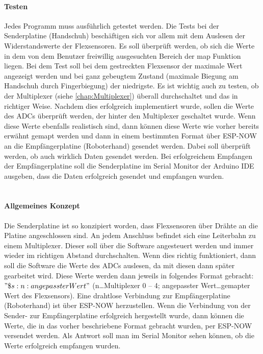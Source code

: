 \documentclass[titlepage,12pt,twoside]{article}
\begin{document}
\paragraph{Testen}
\hfill \break
\hfill \break
Jedes Programm muss ausführlich getestet werden. Die Tests bei der Senderplatine (Handschuh) beschäftigen sich vor allem mit 
dem Auslesen der Widerstandswerte der Flexsensoren. Es soll überprüft werden, ob sich die Werte in dem von dem Benutzer 
freiwillig ausgesuchten Bereich der map Funktion liegen. Bei dem Test soll bei dem gestreckten Flexsensor der maximale Wert 
angezeigt werden und bei ganz gebeugtem Zustand (maximale Biegung am Handschuh durch Fingerbiegung) der niedrigste. Es ist 
wichtig auch zu testen, ob der Multiplexer (siehe \autoref{chap:Multiplexer}) überall durchschaltet und das in richtiger Weise. Nachdem dies erfolgreich 
implementiert wurde, sollen die Werte des ADCs überprüft werden, der hinter den Multiplexer geschaltet wurde. Wenn diese Werte 
ebenfalls realistisch sind, dann können diese Werte wie vorher bereits erwähnt gemapt werden und dann in einem bestimmten Format 
über ESP-NOW an die Empfängerplatine (Roboterhand) gesendet werden. Dabei soll überprüft werden, ob auch wirklich Daten 
gesendet werden. Bei erfolgreichem Empfangen der Empfängerplatine soll die Senderplatine im Serial Monitor der Arduino IDE 
ausgeben, dass die Daten erfolgreich gesendet und empfangen wurden. \\
\\
\paragraph{Allgemeines Konzept}
\hfill \break
\hfill \break
Die Senderplatine ist so konzipiert worden, dass Flexsensoren über Drähte an die Platine angeschlossen sind. An jedem Anschluss 
befindet sich eine Leiterbahn zu einem Multiplexer. Dieser soll über die Software angesteuert werden und immer wieder im 
richtigen Abstand durchschalten. Wenn dies richtig funktioniert, dann soll die Software die Werte des ADCs auslesen, da mit 
diesen dann später gearbeitet wird. Diese Werte werden dann jeweils in folgendes Format gebracht: $"\$s:n:angepassterWert"$ 
(n…Multiplexer 0 – 4; angepasster Wert…gemapter Wert des Flexsensors). Eine drahtlose Verbindung zur Empfängerplatine 
(Roboterhand) ist über ESP-NOW herzustellen. Wenn die Verbindung von der Sender- zur Empfängerplatine erfolgreich hergestellt 
wurde, dann können die Werte, die in das vorher beschriebene Format gebracht wurden, per ESP-NOW versendet werden. Als Antwort 
soll man im Serial Monitor sehen können, ob die Werte erfolgreich empfangen wurden. \\
\\
\end{document}
